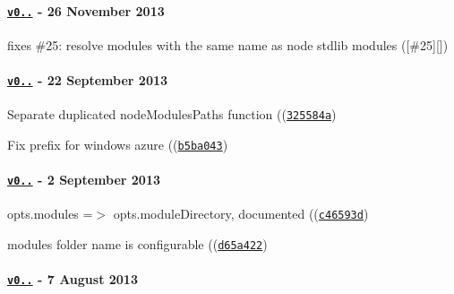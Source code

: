 \paragraph*{\href{https://github.com/browserify/resolve/compare/v0.5.1...v0.6.0}{\tt v0..} -\/ 26 November 2013}


\begin{DoxyItemize}
\item fixes \#25\+: resolve modules with the same name as node stdlib modules (\mbox{[}{\ttfamily \#25}\mbox{]}\mbox{[}\mbox{]})
\end{DoxyItemize}

\paragraph*{\href{https://github.com/browserify/resolve/compare/v0.5.0...v0.5.1}{\tt v0..} -\/ 22 September 2013}


\begin{DoxyItemize}
\item Separate duplicated node\+Modules\+Paths function ((\href{https://github.com/browserify/resolve/commit/325584a685db8f42aae3d4876ffbe64069233601}{\tt {\ttfamily 325584a}})
\item Fix prefix for windows azure ((\href{https://github.com/browserify/resolve/commit/b5ba0430b012d93367a4f87c304f1d4c8c22941c}{\tt {\ttfamily b5ba043}})
\end{DoxyItemize}

\paragraph*{\href{https://github.com/browserify/resolve/compare/v0.4.3...v0.5.0}{\tt v0..} -\/ 2 September 2013}


\begin{DoxyItemize}
\item opts.\+modules =$>$ opts.\+module\+Directory, documented ((\href{https://github.com/browserify/resolve/commit/c46593de74b256196d7ea12c85422698652cff10}{\tt {\ttfamily c46593d}})
\item modules folder name is configurable ((\href{https://github.com/browserify/resolve/commit/d65a42238101ea284ddafb788debdad0e5a59504}{\tt {\ttfamily d65a422}})
\end{DoxyItemize}

\paragraph*{\href{https://github.com/browserify/resolve/compare/v0.4.2...v0.4.3}{\tt v0..} -\/ 7 August 2013}


